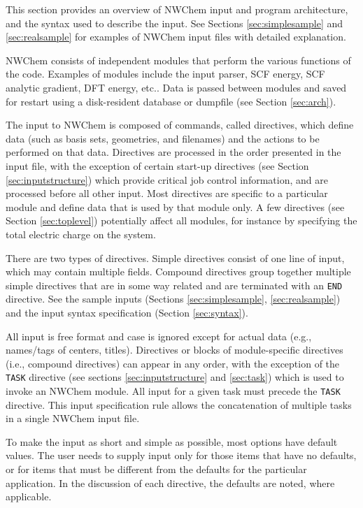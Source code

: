 \label{sec:getstart}

This section provides an overview of NWChem input and program
architecture, and the syntax used to describe the input.  See Sections
\ref{sec:simplesample} and \ref{sec:realsample} for examples of NWChem
input files with detailed explanation.

NWChem consists of independent modules that perform the various
functions of the code.  Examples of modules include the input parser,
SCF energy, SCF analytic gradient, DFT energy, etc..  Data is passed
between modules and saved for restart using a disk-resident database
or dumpfile (see Section \ref{sec:arch}).

The input to NWChem is composed of commands, called directives, which
define data (such as basis sets, geometries, and filenames) and the
actions to be performed on that data.  Directives are processed in the order
presented in the input file, with the exception of certain start-up
directives (see Section \ref{sec:inputstructure}) which provide
critical job control information, and are processed before all other
input.  Most directives are specific to a particular module and define
data that is used by that module only.  A few directives (see Section
\ref{sec:toplevel}) potentially affect all modules, for instance by
specifying the total electric charge on the system.    

There are two types of directives.  Simple directives consist of one
line of input, which may contain multiple fields.  Compound directives
group together multiple simple directives that are in some way
related and are terminated with an \verb+END+ directive.  See the
sample inputs (Sections \ref{sec:simplesample}, \ref{sec:realsample})
and the input syntax specification (Section \ref{sec:syntax}).

All input is free format and case is ignored except for actual data
(e.g., names/tags of centers, titles). Directives or blocks of
module-specific directives (i.e., compound directives) can appear in
any order, with the exception of the \verb+TASK+ directive (see
sections \ref{sec:inputstructure} and \ref{sec:task}) which is used to
invoke an NWChem module.  All input for a given task must
precede the \verb+TASK+ directive.  This input specification rule
allows the concatenation of multiple tasks in a single NWChem input
file. 

To make the input as short and simple as possible, most options have
default values.  The user needs to supply input only for those items that
have no defaults, or for items that must be different from the defaults
for the particular application.  In the discussion of each directive, the
defaults are noted, where applicable.

